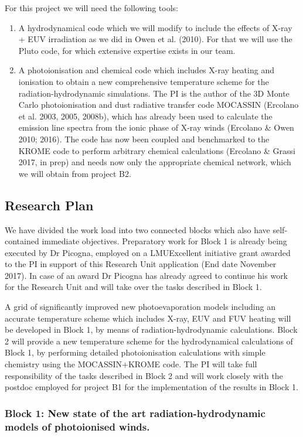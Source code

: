 \documentclass[10pt,fleqn,twoside]{article}
\begin{document}
For this project we will need the following tools: 
\begin{enumerate}
\item A hydrodynamical code which we will modify to include the
  effects of X-ray + EUV irradiation as we did in Owen et al. (2010). For
  that we will use the Pluto code, for which extensive expertise
  exists in our team. 
\item A photoionisation and chemical code which includes X-ray
  heating and ionisation to obtain a new comprehensive temperature
  scheme for the radiation-hydrodynamic simulations. The PI is the
  author of the 3D Monte Carlo photoionisation and dust radiative
  transfer code MOCASSIN (Ercolano et al. 2003, 2005, 2008b),
  which has already been used to calculate the 
  emission line spectra from the ionic phase of X-ray winds (Ercolano
  \& Owen 2010; 2016). The code has
  now been coupled and benchmarked to the KROME code to perform
  arbitrary chemical calculations (Ercolano \& Grassi 2017, in prep)
  and needs now only the appropriate chemical network, which
  we will obtain from project B2.  
\end{enumerate}

\subsection{Research Plan} 

We have divided the work load into two connected blocks which
also have self-contained immediate objectives. Preparatory work for
Block 1 is already being executed by Dr Picogna, employed on a
LMUExcellent initiative grant awarded to the PI in support of
this Research Unit application (End date November 2017). In case of an award Dr Picogna
has already agreed to continue his work for the Research Unit and will
take over the tasks described in Block 1. 

A grid of significantly improved new photoevaporation models including
an accurate temperature scheme which includes X-ray, EUV and FUV
heating will be developed in Block 1, by means of
radiation-hydrodynamic calculations. Block 2 will provide a new
temperature scheme for the hydrodynamical calculations of Block 1, by
performing detailed photoionisation calculations with simple chemistry
using the MOCASSIN+KROME code. The PI will take full responsibility of
the tasks described in Block 2 and will work closely with the postdoc
employed for project B1
for the implementation of the results in Block 1.  

\subsubsection{Block 1: New state of the art radiation-hydrodynamic
  models of photoionised winds.}
\end{document}
